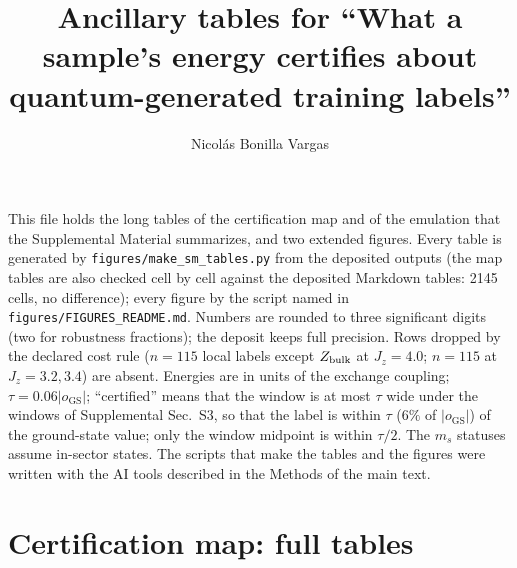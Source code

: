 \documentclass[aps,prx,onecolumn,10pt,nofootinbib,longbibliography,floatfix]{revtex4-2}
\theoremstyle{remark}
\newcommand{\Jz}{J_z}
\newcommand{\ms}{m_s}
\newcommand{\GS}{\mathrm{GS}}
\begin{document}
\title{Ancillary tables for ``What a sample's energy certifies about quantum-generated training labels''}
\author{Nicol\'as Bonilla Vargas}
\maketitle

\noindent This file holds the long tables of the certification map and of the emulation that the Supplemental
Material summarizes, and two extended figures. Every table is generated by \texttt{figures/make\_sm\_tables.py}
from the deposited outputs (the map tables are also checked cell by cell against the deposited Markdown tables:
2145 cells, no difference); every figure by the script named in \texttt{figures/FIGURES\_README.md}. Numbers are %
rounded to three significant digits (two for robustness fractions); the deposit keeps full precision. Rows dropped by
the declared cost rule ($n=115$ local labels except $Z_{\rm bulk}$ at $\Jz=4.0$; $n=115$ at $\Jz=3.2,3.4$) are
absent. Energies are in units of the exchange coupling; $\tau=0.06|o_\GS|$; ``certified'' means that the window is %
at most $\tau$ wide under the windows of Supplemental Sec.~S3, so that the label is within $\tau$ ($6\%$ of %
$|o_\GS|$) of the ground-state value; only the window midpoint is within $\tau/2$. The $\ms$ statuses assume
in-sector states. The scripts that make the tables and the figures were written with the AI tools described in the
Methods of the main text.

\section{Certification map: full tables}
\def\SMcap{Widths of the information limit at $n=57$. Each block is one label and each row one computed coupling
$\Jz$ ($^\dagger$: out-of-distribution point, where no energy is published and the conditional floor
$\epsilon_{\rm dig}=0.012\,n$ is used). Read along a row: the energy window always contains an interval at least %
$w_{\rm in}$ wide, and DMRG-referenced bounds show it is at most $w_{\rm out}$ wide. $o_\GS$: ground-state value (bond
dimension $320$); $\epsilon_{\rm dig}=E_{\rm dig}-E_0$: the dataset's total energy error, read from its figures %
(reading 1); $w_{\rm in}$: rigorous inner width at the lower window $E_{\rm lo}$ (hull of the stored sector states and
two-state mixtures); $w_{\rm pure}$: the same with single stored pure states only; $w_{\rm out}$: outer width at the
upper window $E_{\rm up}$; last column: the map value, the outer width at the dataset's energy in units of
$\tau=0.06|o_\GS|$. Bold $\Jz$: certified, i.e.\ $w_{\rm out}(E_{\rm up})\le\tau$.}\def\SMlab{tab:map_widths_n57} %

\end{document}
